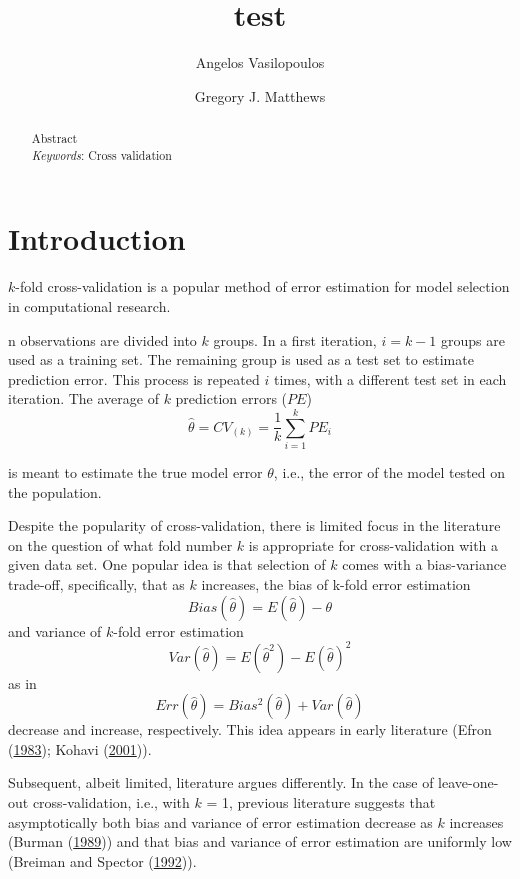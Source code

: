 \documentclass[
  12pt,
]{article}
\title{test}
\author{Angelos Vasilopoulos \and Gregory J. Matthews}
\date{}
\begin{document}
\maketitle
\begin{abstract}
Abstract \vspace{2mm}\\
\emph{Keywords}: Cross validation
\end{abstract}

\newpage

\hypertarget{sec:intro}{%
\section{Introduction}\label{sec:intro}}

\(k\)-fold cross-validation is a popular method of error estimation for
model selection in computational research.

n observations are divided into \(k\) groups. In a first iteration,
\(i = k - 1\) groups are used as a training set. The remaining group is
used as a test set to estimate prediction error. This process is
repeated \(i\) times, with a different test set in each iteration. The
average of \(k\) prediction errors (\(PE\))
\[\hat{\theta} = CV_{(k)} = \frac{1}{k}\sum_{i=1}^{k}PE_i\]

is meant to estimate the true model error \(\theta\), i.e., the error of
the model tested on the population.

Despite the popularity of cross-validation, there is limited focus in
the literature on the question of what fold number \(k\) is appropriate
for cross-validation with a given data set. One popular idea is that
selection of \(k\) comes with a bias-variance trade-off, specifically,
that as \(k\) increases, the bias of k-fold error estimation
\[Bias(\hat{\theta}) = E(\hat{\theta}) - \theta\] and variance of
\(k\)-fold error estimation
\[Var(\hat{\theta}) = E(\hat{\theta}^2) - E(\hat{\theta})^2\] as in
\[Err(\hat{\theta}) = Bias^2(\hat{\theta}) + Var(\hat{\theta})\]
decrease and increase, respectively. This idea appears in early
literature (Efron (\protect\hyperlink{ref-Efron1983}{1983}); Kohavi
(\protect\hyperlink{ref-Kohavi2001}{2001})).

Subsequent, albeit limited, literature argues differently. In the case
of leave-one-out cross-validation, i.e., with \(k\) = 1, previous
literature suggests that asymptotically both bias and variance of error
estimation decrease as \(k\) increases (Burman
(\protect\hyperlink{ref-Burman1989}{1989})) and that bias and variance
of error estimation are uniformly low (Breiman and Spector
(\protect\hyperlink{ref-Breiman1992}{1992})).
\end{document}
